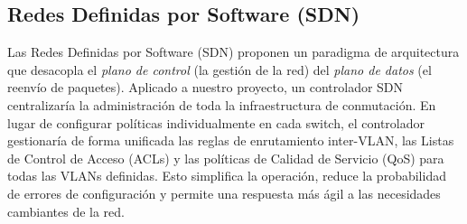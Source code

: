 \subsection{Redes Definidas por Software (SDN)}
Las Redes Definidas por Software (SDN) proponen un paradigma de arquitectura que desacopla el \textit{plano de control} (la gestión de la red) del \textit{plano de datos} (el reenvío de paquetes). Aplicado a nuestro proyecto, un controlador SDN centralizaría la administración de toda la infraestructura de conmutación. En lugar de configurar políticas individualmente en cada switch, el controlador gestionaría de forma unificada las reglas de enrutamiento inter-VLAN, las Listas de Control de Acceso (ACLs) y las políticas de Calidad de Servicio (QoS) para todas las VLANs definidas. Esto simplifica la operación, reduce la probabilidad de errores de configuración y permite una respuesta más ágil a las necesidades cambiantes de la red.